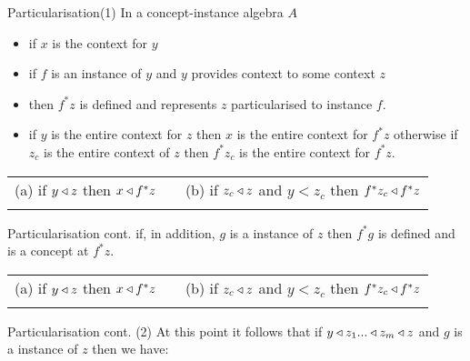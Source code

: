 \begin{frame}{Particularisation(1)}
In a concept-instance algebra $A$

\begin{itemize}
\item if $x$ is the context for $y$
\item if $f$ is an instance of $y$ and $y$ provides context to some context $z$
\item then  $f^*z$  is defined and represents $z$ particularised to instance $f$.
\item if $y$ is the entire context for $z$ then $x$ is the entire context for $f^*z$
otherwise if $z_c$ is the entire context of $z$ then $f^*z_c$ is the entire context for $f^*z$.
\end{itemize}
\medskip
\pause
\begin{tabular} {c p{0.2cm} c}
(a) if $y \triangleleft z$ then $x \triangleleft f^*z$   &&   (b) if $z_c \triangleleft z$ and $y <z_c$ then $f^*z_c \triangleleft f^*z$ \\[0.5cm]
&& \\
\end{tabular}
\end{frame}

\begin{frame}{Particularisation cont.}
if, in addition, $g$ is a instance of $z$ then $f^*g$ is defined and is a concept at $f^*z$. \\

\medskip
\pause
\begin{tabular} {c p{0.2cm} c}
(a) if $y \triangleleft z$ then $x \triangleleft f^*z$   &&   (b) if $z_c \triangleleft z$ and $y <z_c$ then $f^*z_c \triangleleft f^*z$ \\[0.5cm]
&& \\
\end{tabular}
\end{frame}

\begin{frame}{Particularisation cont. (2)}
At this point it follows that if $y \triangleleft z_1 ... \triangleleft z_m \triangleleft z$ and $g$ is a instance of $z$ then we have:
 
\end{frame}







